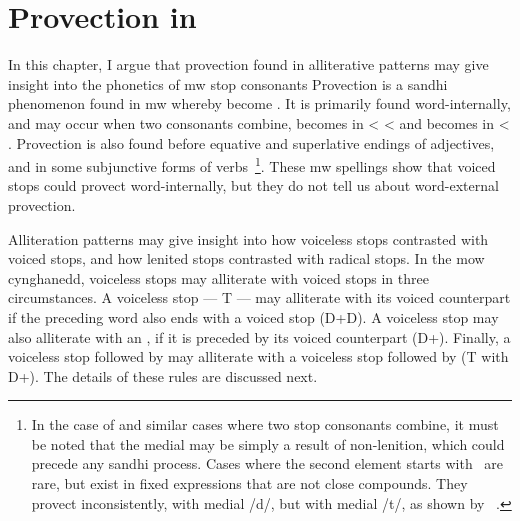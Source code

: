 \chapter{Provection in }
\label{cha:prov-mwbe-y}

In this chapter, I argue that provection found in alliterative patterns may
give insight into the phonetics of \gls{mw} stop consonants
 Provection is a sandhi phenomenon found in \gls{mw} whereby  become .  It is primarily found word-internally, and
 may occur when two consonants combine, \eg {} becomes 
 in   <  <  and  becomes  in  < .
 Provection is also found before equative and superlative endings of
 adjectives, and in some subjunctive forms of
 verbs~\autocite[\S 17]{evans_grammar_1964}\footnote{In the case
   of  and similar cases where two stop consonants combine,
   it must be noted that the medial  may be simply a result of
   non-lenition, which could precede any sandhi process. Cases where
   the second element starts with \xD\ are rare, but exist in fixed
   expressions that are not close compounds. They provect
   inconsistently, \eg {} with
   medial /d/, but  with medial /t/, as
   shown by ~\autocite[s.v.\ \emph{rhad}]{bevan_geiriadur_2014}.}.
 These \gls{mw} spellings show that voiced stops could provect
 word-internally, but they do not tell us about word-external
 provection.
 
 Alliteration patterns may give insight into how voiceless stops
 contrasted with voiced stops, and how lenited stops contrasted with
 radical stops. In the \gls{mow} cynghanedd, voiceless stops may
 alliterate with voiced stops in three circumstances. A voiceless stop
 --- \gls{T} --- may alliterate with its voiced counterpart if the
 preceding word also ends with a voiced stop (\gls{D}+\gls{D}). A
 voiceless stop may also alliterate with an , if it is preceded
 by its voiced counterpart (\gls{D}+). Finally, a voiceless stop
 followed by  may alliterate with a voiceless stop followed
 by  (\gls{T} with \gls{D}+).
 The details of these rules are discussed next.


